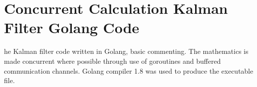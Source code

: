 \chapter{Concurrent Calculation Kalman Filter Golang Code}
\label{app:Goconcurrent}

he Kalman filter code written in Golang, basic commenting. The mathematics is made concurrent where possible through use of goroutines and buffered communication channels. Golang compiler 1.8 was used to produce the executable file.
\newline


%